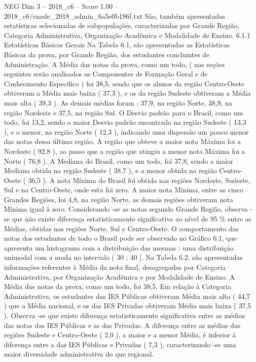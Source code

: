 \begin{textsample}{NEG Dim 3 – 2018\_c6 – Score 1.00 – 2018\_c6/enade\_2018\_admin\_6a5e0b186f.txt}
São, também apresentadas estatísticas selecionadas de subpopulações, caracterizadas por Grande Região, Categoria Administrativa, Organização Acadêmica e Modalidade de Ensino. 6.1.1 Estatísticas Básicas Gerais Na Tabela 6.1, são apresentadas as Estatísticas Básicas da prova, por Grande Região, dos estudantes concluintes de Administração.
A Média das notas da prova, como um todo, ( nas seções seguintes serão analisados os Componentes de Formação Geral e de Conhecimento Específico ) foi 38,5, sendo que os alunos da região Centro-Oeste obtiveram a Média mais baixa ( 37,3 ), e os da região Sudeste obtiveram a Média mais alta ( 39,3 ).
As demais médias foram : 37,9, na região Norte, 38,9, na região Nordeste e 37,5, na região Sul.
O Desvio padrão para o Brasil, como um todo, foi 13,2, sendo o maior Desvio padrão encontrado na região Sudeste ( 13,3 ), e o menor, na região Norte ( 12,3 ), indicando uma dispersão um pouco menor das notas dessa última região.
A região que obteve a maior nota Máxima foi a Nordeste ( 92,8 ), ao passo que a região que atingiu a menor nota Máxima foi a Norte ( 76,8 ).
A Mediana do Brasil, como um todo, foi 37,8, sendo a maior Mediana obtida na região Sudeste ( 38,7 ), e a menor obtida na região Centro-Oeste ( 36,5 ).
A nota Mínima do Brasil foi obtida nas regiões Nordeste, Sudeste, Sul e na Centro-Oeste, onde esta foi zero.
A maior nota Mínima, entre as cinco Grandes Regiões, foi 4,8, na região Norte, as demais regiões obtiveram nota Mínima igual à zero.
Considerando -se as notas segundo Grande Região, observa -se que não existe diferença estatisticamente significativa ao nível de 95 \% entre as Médias, obtidas nas regiões Norte, Sul e Centro-Oeste.
O comportamento das notas dos estudantes de todo o Brasil pode ser observado no Gráfico 6.1, que apresenta um histograma com a distribuição das mesmas : uma distribuição unimodal com a moda no intervalo ( 30 ; 40 ].
Na Tabela 6.2, são apresentadas informações referentes à Média da nota final, desagregadas por Categoria Administrativa, por Organização Acadêmica e por Modalidade de Ensino.
A Média das notas da prova, como um todo, foi 38,5.
Em relação à Categoria Administrativa, os estudantes das IES Públicas obtiveram Média mais alta ( 44,7 ) que a Média nacional, e os das IES Privadas obtiveram Média mais baixa ( 37,5 ).
Observa -se que existe diferença estatisticamente significativa entre as médias das notas das IES Públicas e as das Privadas.
A diferença entre as médias das regiões Sudeste e Centro-Oeste ( 2,0 ), a maior e a menor Média, é inferior à diferença entre a das IES Públicas e Privadas ( 7,3 ), caracterizando -se uma maior diversidade administrativa do que regional.

\end{textsample}
